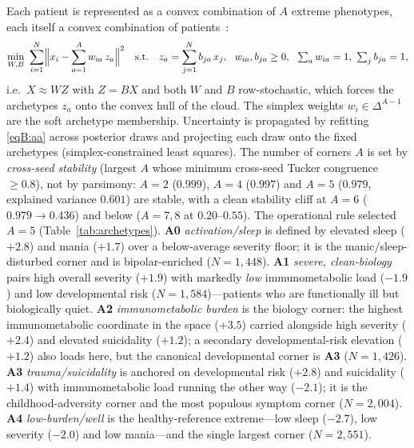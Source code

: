 Each patient is represented as a convex combination of $A$ extreme phenotypes, each
itself a convex combination of patients~\citep{cutler1994archetypal}:
\begin{equation}
  \min_{W,B}\ \sum_{i=1}^{N}\Bigl\lVert x_i-\sum_{a=1}^{A} w_{ia}\,z_a\Bigr\rVert^2
  \quad\text{s.t.}\quad z_a=\sum_{j=1}^{N} b_{ja}\,x_j,\ \
  w_{ia},b_{ja}\ge 0,\ \ \textstyle\sum_a w_{ia}=1,\ \sum_j b_{ja}=1 ,
  \label{eqB:aa}
\end{equation}
i.e.\ $X\approx WZ$ with $Z=BX$ and both $W$ and $B$ row-stochastic, which forces the
archetypes $z_a$ onto the convex hull of the cloud. The simplex weights
$w_i\in\Delta^{A-1}$ are the soft archetype membership. Uncertainty is propagated by
refitting \eqref{eqB:aa} across posterior draws and projecting each draw onto the fixed
archetypes (simplex-constrained least squares). The number of corners $A$ is set by
\emph{cross-seed stability} (largest $A$ whose minimum cross-seed Tucker congruence
$\ge0.8$), not by parsimony: $A=2$ ($0.999$), $A=4$ ($0.997$) and $A=5$ ($0.979$,
explained variance $0.601$) are stable, with a clean stability cliff at $A=6$
($0.979\!\to\!0.436$) and below ($A=7,8$ at $0.20$--$0.55$). The operational rule
selected $A=5$ (Table~\ref{tab:archetypes}). \textbf{A0} \emph{activation/sleep} is
defined by elevated sleep ($+2.8$) and mania ($+1.7$) over a below-average severity
floor; it is the manic/sleep-disturbed corner and is bipolar-enriched ($N=1{,}448$).
\textbf{A1} \emph{severe, clean-biology} pairs high overall severity ($+1.9$) with
markedly \emph{low} immunometabolic load ($-1.9$) and low developmental risk
($N=1{,}584$)---patients who are functionally ill but biologically quiet. \textbf{A2}
\emph{immunometabolic burden} is the biology corner: the highest immunometabolic
coordinate in the space ($+3.5$) carried alongside high severity ($+2.4$) and elevated
suicidality ($+1.2$); a secondary developmental-risk elevation ($+1.2$) also loads here,
but the canonical developmental corner is \textbf{A3} ($N=1{,}426$). \textbf{A3}
\emph{trauma/suicidality} is anchored on developmental risk ($+2.8$) and suicidality
($+1.4$) with immunometabolic load running the other way ($-2.1$); it is the
childhood-adversity corner and the most populous symptom corner ($N=2{,}004$).
\textbf{A4} \emph{low-burden/well} is the healthy-reference extreme---low sleep ($-2.7$),
low severity ($-2.0$) and low mania---and the single largest corner ($N=2{,}551$).
%

